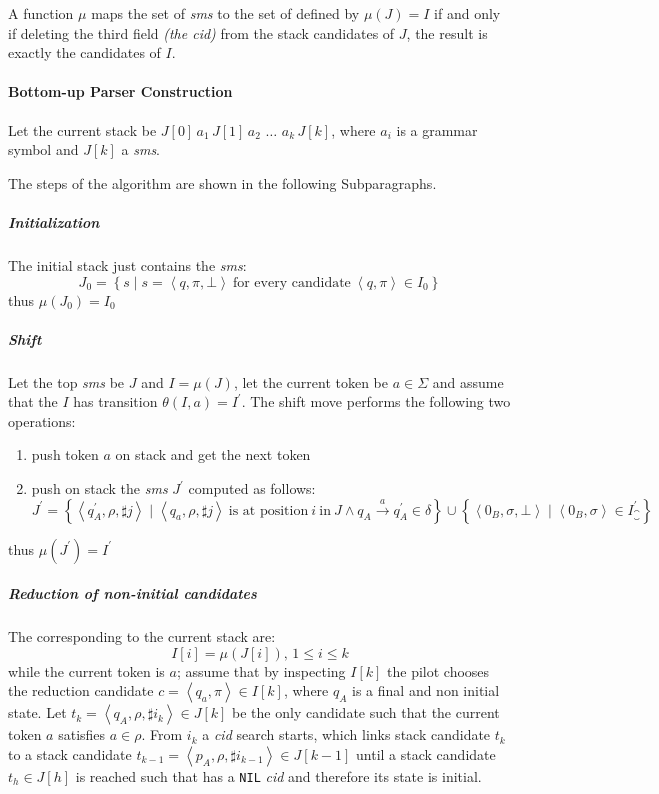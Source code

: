 \documentclass[english]{article}
\begin{document}
A function \(\mu\) maps the set of \textit{sms} to the set of \mstates defined by \(\mu(J) = I\) if and only if deleting the third field \textit{(the cid)} from the stack candidates of \(J\), the result is exactly the candidates of \(I\).

\paragraph{Bottom-up Parser Construction}
\label{par:parser-algorithm-bottom-up}

Let the current stack be \(J[0] \, a_1 \, J[1] \, a_2 \, \,\ldots\, \, a_k \, J[k]\), where \(a_i\) is a grammar symbol and \(J[k]\) a \textit{sms}.

The steps of the algorithm are shown in the following Subparagraphs.

\subparagraph*{Initialization}
The initial stack just contains the \textit{sms}:
\[ J_0 = \left\{ s \mid s = \left\langle q, \pi, \bot \right\rangle \ \text{for every candidate} \ \left\langle q, \pi \right\rangle \in I_0 \right\} \]
thus \(\mu(J_0) = I_0\)

\subparagraph*{Shift}
Let the top \textit{sms} be \(J\) and \(I = \mu(J)\), let the current token be \(a \in \Sigma\) and assume that the \mstate \(I\) has transition \(\theta(I, a) = I^\prime\). The shift move performs the following two operations:
\begin{enumerate}[label=\arabic*., ref=(\arabic*)]
  \item\label{enum:shift-move-1} push token \(a\) on stack and get the next token
  \item\label{enum:shift-move-2} push on stack the \textit{sms} \(J^\prime\) computed as follows:
  \[
    J^\prime  =  \left\{ \left\langle q_A^\prime, \rho, \sharp j \right\rangle \mid \left\langle q_a, \rho, \sharp j \right\rangle \ \text{is at position} \ i \ \text{in} \ J \land q_A \xrightarrow{a} q_A^\prime \in \delta \right\}
    \cup         \left\{ \left\langle 0_B, \sigma, \bot \right\rangle \mid \left\langle 0_B, \sigma  \right\rangle \in I_{\closure}^\prime \right\}
  \]
\end{enumerate}
thus \(\mu(J^\prime) = I^\prime\)

\subparagraph*{Reduction of non-initial candidates}

The \mstates corresponding to the current stack are:
\[ I[i] = \mu\left( J[i] \right), \, 1 \leq i \leq k \]
while the current token is \(a\);
assume that by inspecting \(I[k]\) the pilot chooses the reduction candidate \(c = \left\langle q_a, \pi \right\rangle \in I[k]\), where \(q_A\) is a final and non initial state.
Let \(t_k = \left\langle q_A, \rho, \sharp i_k \right\rangle \in J[k]\) be the only candidate such that the current token \(a\) satisfies \(a \in \rho\).
From \(i_k\) a \textit{cid} search starts, which links stack candidate \(t_k\) to a stack candidate \(t_{k-1} = \left\langle p_A, \rho, \sharp i_{k-1} \right\rangle \in J[k-1]\) until a stack candidate \(t_h \in J[h]\) is reached such that has a \texttt{NIL} \textit{cid} and therefore its state is initial.
\end{document}
